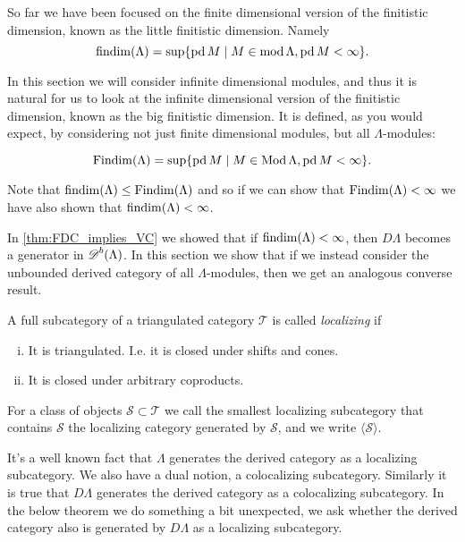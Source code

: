 
So far we have been focused on the finite dimensional version of the finitistic dimension, known as the little finitistic dimension. Namely 
$$\operatorname{findim}(\Lambda) = \sup\{\operatorname{pd} M \mid M \in \operatorname{mod}\Lambda, \operatorname{pd} M < \infty\}.$$

In this section we will consider infinite dimensional modules, and thus it is natural for us to look at the infinite dimensional version of the finitistic dimension, known as the big finitistic dimension. It is defined, as you would expect, by considering not just finite dimensional modules, but all $\Lambda$-modules:

$$\operatorname{Findim}(\Lambda) = \sup\{\operatorname{pd} M \mid M \in \operatorname{Mod}\Lambda, \operatorname{pd} M < \infty\}.$$

Note that $\operatorname{findim}(\Lambda) \leq \operatorname{Findim}(\Lambda)$ and so if we can show that $\operatorname{Findim}(\Lambda) < \infty$ we have also shown that $\operatorname{findim}(\Lambda) < \infty$.

In \cref{thm:FDC_implies_VC} we showed that if $\operatorname{findim}(\Lambda) < \infty$, then $D\Lambda$ becomes a generator in $\operatorname{\mathscr{D}}^b(\Lambda)$. In this section we show that if we instead consider the unbounded derived category of all $\Lambda$-modules, then we get an analogous converse result.

\begin{defn}
	A full subcategory of a triangulated category $\mathcal T$ is called \emph{localizing} if
	\begin{enumerate}[i)]
		\item It is triangulated. I.e. it is closed under shifts and cones.
		\item It is closed under arbitrary coproducts.
	\end{enumerate}
	For a class of objects $\mathcal S \subset \mathcal T$ we call the smallest localizing subcategory that contains $\mathcal S$ the localizing category generated by $\mathcal S$, and we write $\langle \mathcal S \rangle$.
\end{defn}

It's a well known fact that $\Lambda$ generates the derived category as a localizing subcategory. We also have a dual notion, a colocalizing subcategory. Similarly it is true that $D\Lambda$ generates the derived category as a colocalizing subcategory. In the below theorem we do something a bit unexpected, we ask whether the derived category also is generated by $D\Lambda$ as a localizing subcategory.

